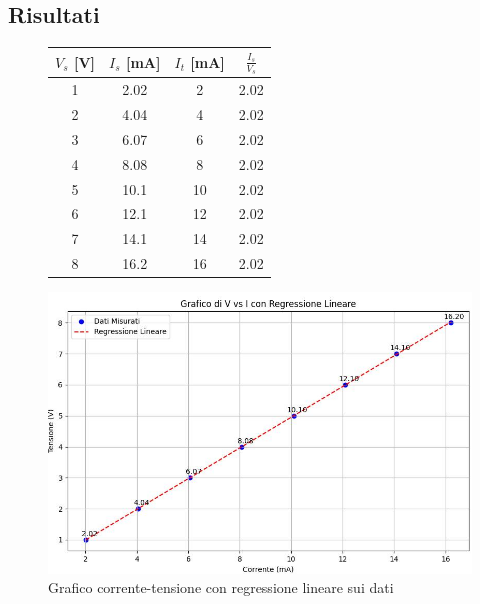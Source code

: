 \subsection{Risultati}
\begin{figure}[ht]
    \centering
    \begin{minipage}{0.45\textwidth}
        \centering
        \begin{tabular}{c|c|c|c}
            \toprule
            $V_s$ [V] & $I_s$ [mA] & $I_t$ [mA] & $\frac{I_s}{V_s}$ \\
            \midrule
            1    & 2.02  & 2    & 2.02  \\
            2    & 4.04  & 4    & 2.02  \\
            3    & 6.07  & 6    & 2.02  \\
            4    & 8.08  & 8    & 2.02  \\
            5    & 10.1  & 10   & 2.02  \\
            6    & 12.1  & 12   & 2.02  \\
            7    & 14.1  & 14   & 2.02  \\
            8    & 16.2  & 16   & 2.02  \\
            \bottomrule
        \end{tabular}
    \end{minipage}%
    \hspace{0.05\textwidth}
    \begin{minipage}{0.45\textwidth}
        \centering
        \includegraphics[width=\linewidth]{immagine1.jpg}
        \caption{Grafico corrente-tensione con regressione lineare sui dati}
        \label{fig:immagine}
    \end{minipage}
\end{figure}
